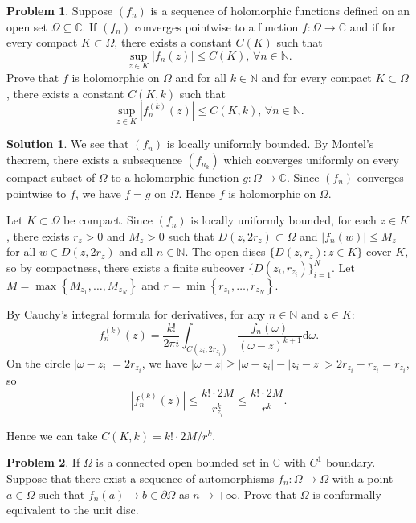 \documentclass{article}
\theoremstyle{definition}
\newtheorem{problem}{Problem}
\newtheorem{solution}{Solution}
\newcommand{\N}{\mathbb{N}}
\newcommand{\C}{\mathbb{C}}
\newcommand{\dd}{\mathrm{d}}
\renewcommand{\leq}{\leqslant}
\renewcommand{\geq}{\geqslant}
\begin{document}
\begin{problem}
    Suppose $(f_n)$ is a sequence of holomorphic functions defined on an open set $\Omega\subseteq \C$. If $(f_n)$ converges pointwise to a function $f\colon \Omega\to\C$ and if for every compact $K\subset \Omega$, there exists a constant $C(K)$ such that 
    \[\sup_{z\in K}|f_n(z)|\leq C(K),\,\forall n\in\N.\] 
    Prove that $f$ is holomorphic on $\Omega$ and for all $k\in \N$ and for every compact $K\subset \Omega$, there exists a constant $C(K,k)$ such that
    \[\sup_{z\in K}\left|f_n^{(k)}(z)\right|\leq C(K,k),\,\forall n\in\N.\] 
\end{problem}
\begin{solution}
    We see that $(f_n)$ is locally uniformly bounded. By Montel's theorem, there exists a subsequence $(f_{n_k})$ which converges uniformly on every compact subset of $\Omega$ to a holomorphic function $g\colon \Omega\to\C$. Since $(f_n)$ converges pointwise to $f$, we have $f=g$ on $\Omega$. Hence $f$ is holomorphic on $\Omega$. 
    
    Let $K \subset \Omega$ be compact. Since $(f_n)$ is locally uniformly bounded, for each $z \in K$, there exists $r_z > 0$ and $M_z > 0$ such that $D(z, 2r_z) \subset \Omega$ and $|f_n(w)| \leq M_z$ for all $w \in D(z, 2r_z)$ and all $n \in \mathbb{N}$.
    The open discs $\{D(z, r_z) \colon z \in K\}$ cover $K$, so by compactness, there exists a finite subcover $\{D(z_i, r_{z_i})\}_{i=1}^N$. Let $M = \max\left\{M_{z_1}, \dots, M_{z_N}\right\}$ and $r = \min\left\{r_{z_1}, \dots, r_{z_N}\right\}$.
    
    By Cauchy's integral formula for derivatives, for any $n\in \N$ and $z \in K$:
    \[
    f_n^{(k)}(z) = \frac{k!}{2\pi i} \int_{C\left(z_i, 2r_{z_i}\right)} \frac{f_n(\omega)}{(\omega - z)^{k+1}} \dd\omega.
    \]
    On the circle $|\omega - z_i| = 2r_{z_i}$, we have $|\omega - z| \geq |\omega - z_i| - |z_i - z| > 2r_{z_i} - r_{z_i} = r_{z_i}$, so
    \[
    \left|f_n^{(k)}(z)\right| \leq \frac{k! \cdot 2M}{r_{z_i}^{k}} \leq \frac{k! \cdot 2M}{r^{k}}.
    \]

    Hence we can take $C(K,k)=k! \cdot 2M/{r^{k}}$.
\end{solution}
\begin{problem}
    If $\Omega$ is a connected open bounded set in $\C$ with $C^1$ boundary. Suppose that there exist a sequence of automorphisms $f_n\colon \Omega \to \Omega$ with a point $a\in \Omega$ such that $f_n(a)\to b\in \partial \Omega$ as $n\to +\infty$. 
    Prove that $\Omega$ is conformally equivalent to the unit disc.
\end{problem}
\end{document}
